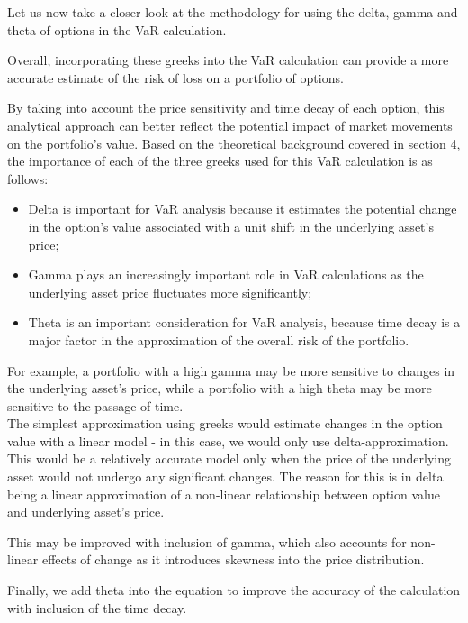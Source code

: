 \documentclass[a4paper, 12pt]{article}
\theoremstyle{definition}
\theoremstyle{plain}
\begin{document}
Let us now take a closer look 
at the methodology for using  
the delta, gamma and theta of 
options in the VaR calculation. 


Overall, incorporating these greeks into the VaR calculation 
can provide a more accurate estimate of the risk of 
loss on a portfolio of options.

By taking into account the price sensitivity and time 
decay of each option, this analytical approach can better 
reflect the potential impact of market movements on 
the portfolio's value. Based on the theoretical 
background covered in section 4, the importance of 
each of the three greeks used for this VaR calculation is as follows:

\begin{itemize}
    \item Delta is important for VaR analysis 
    because it estimates the potential change 
    in the option's value associated with a 
    unit shift in the underlying asset's price;
    \item Gamma plays an increasingly important role in 
    VaR calculations as the underlying asset price 
    fluctuates more significantly;
    \item Theta is an important consideration for VaR 
    analysis, because time decay is a major factor
    in the approximation of the overall risk of the portfolio.
\end{itemize}

For example, 
a portfolio with a high gamma may be 
more sensitive to changes in the 
underlying asset's price, 
while a portfolio with a high theta 
may be more sensitive to the passage 
of time.\\


The simplest approximation using greeks would estimate changes 
in the option value with a linear model - in this case, we would 
only use delta-approximation. This would be a relatively accurate 
model only when the price of the underlying asset would not undergo any 
significant changes. The reason for this is in delta being a linear 
approximation of a non-linear relationship between option value and underlying 
asset's price. 

This may be improved with inclusion of gamma, which also accounts for 
non-linear effects of change as it introduces skewness into the price distribution.


Finally, we add theta into the equation to improve the accuracy of the calculation 
with inclusion of the time decay.\\
\end{document}
